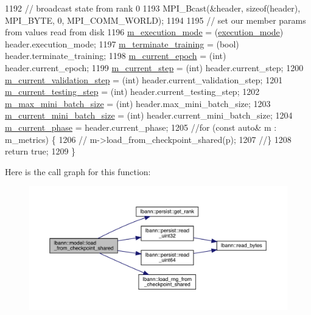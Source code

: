\begin{DoxyCode}
1192   \textcolor{comment}{// broadcast state from rank 0}
1193   MPI\_Bcast(&header, \textcolor{keyword}{sizeof}(header), MPI\_BYTE, 0, MPI\_COMM\_WORLD);
1194 
1195   \textcolor{comment}{// set our member params from values read from disk}
1196   \hyperlink{classlbann_1_1model_a2166e2aad256a335ace3bdcae5da2614}{m\_execution\_mode}     = (\hyperlink{base_8hpp_a2781a159088df64ed7d47cc91c4dc0a8}{execution\_mode}) header.execution\_mode;
1197   \hyperlink{classlbann_1_1model_a639f9c3fcb81b905085f8b1932f8920f}{m\_terminate\_training} = (\textcolor{keywordtype}{bool})           header.terminate\_training;
1198   \hyperlink{classlbann_1_1model_a305fac94b9063e59198c7f936923221a}{m\_current\_epoch}      = (int)            header.current\_epoch;
1199   \hyperlink{classlbann_1_1model_af31a76afc53061747d2170a65e98f692}{m\_current\_step}       = (\textcolor{keywordtype}{int})            header.current\_step;
1200   \hyperlink{classlbann_1_1model_af69e5f6bf49a4990fd4c18984705ab87}{m\_current\_validation\_step} = (int)       header.current\_validation\_step;
1201   \hyperlink{classlbann_1_1model_a2acf043862ba878cb7a91cb0d26c3791}{m\_current\_testing\_step} = (\textcolor{keywordtype}{int})          header.current\_testing\_step;
1202   \hyperlink{classlbann_1_1model_acc496503e7cf8d635e5a31ba09b3c81a}{m\_max\_mini\_batch\_size} = (int)           header.max\_mini\_batch\_size;
1203   \hyperlink{classlbann_1_1model_a982cea92d230bab5a47df504f02daf98}{m\_current\_mini\_batch\_size} = (\textcolor{keywordtype}{int})       header.current\_mini\_batch\_size;
1204   \hyperlink{classlbann_1_1model_a150ef033f81982936e007b10c421f488}{m\_current\_phase}      =                  header.current\_phase;
1205   \textcolor{comment}{//for (const auto& m : m\_metrics) \{}
1206   \textcolor{comment}{//  m->load\_from\_checkpoint\_shared(p);}
1207   \textcolor{comment}{//\}}
1208   \textcolor{keywordflow}{return} \textcolor{keyword}{true};
1209 \}
\end{DoxyCode}
Here is the call graph for this function\+:\nopagebreak
\begin{figure}[H]
\begin{center}
\leavevmode
\includegraphics[width=350pt]{classlbann_1_1model_a2e02dda11636e015ea0c892ffa541881_cgraph}
\end{center}
\end{figure}
